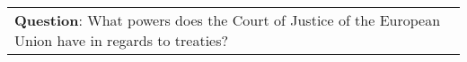 \begin{figure*}[ht]
{\begin{tabular}{p{}}
            \textbf{Question}: What powers does the Court of Justice of the European Union have in regards to treaties?                                                                                                                                                                                                                                                                                                                                                                                                                                                                                                                                                                                                                                                                                                                                                                                                                                                                                                                                                                                                                                                                                                                                                                                                                                                                                                                                                                                                                                                                                                                                                                                                                                                                                                                                                                                                                                                                                             \\

\end{tabular}}
\end{figure*}
